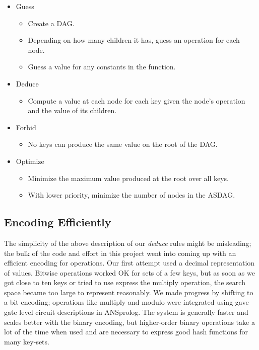 \documentclass{article}
\begin{document}
\begin{itemize}
\item{
	Guess
	\begin{itemize}
		\item Create a DAG.
		\item Depending on how many children it has, guess an operation for each node.
		\item Guess a value for any constants in the function.
	\end{itemize}
}
\item{
	Deduce
	\begin{itemize}
		\item Compute a value at each node for each key given the node's operation and the value of its children.
	\end{itemize}
}
\item{
	Forbid
	\begin{itemize}
		\item No keys can produce the same value on the root of the DAG.
	\end{itemize}
}
\item{
	Optimize
	\begin{itemize}
		\item Minimize the maximum value produced  at the root over all keys.
		\item With lower priority, minimize the number of nodes in the ASDAG.
	\end{itemize}
}
\end{itemize}

\subsection{Encoding Efficiently}
The simplicity of the above description of our \textit{deduce} rules might be misleading; the bulk of the code and effort in this project went into coming up with an efficient encoding for operations. Our first attempt used a decimal representation of values. Bitwise operations worked OK for sets of a few keys, but as soon as we got close to ten keys or tried to use express the multiply operation, the search space became too large to represent reasonably. We made progress by shifting to a bit encoding; operations like multiply and modulo were integrated using gave gate level circuit descriptions in ANSprolog. The system is generally faster and scales better with the binary encoding, but higher-order binary operations take a lot of the time when used and are necessary to express good hash functions for many key-sets.
\end{document}
